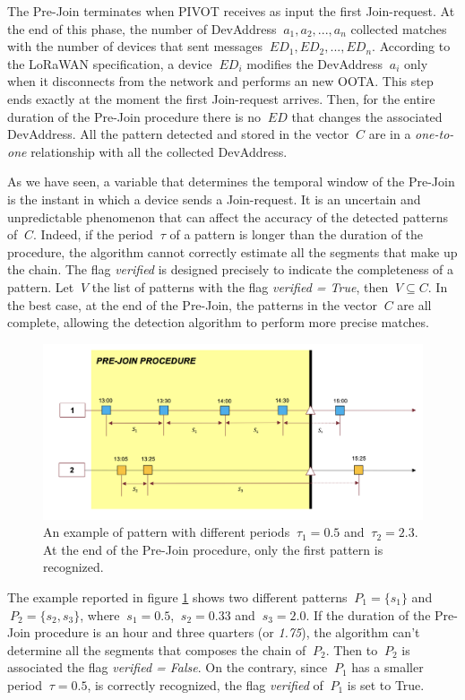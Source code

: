 The Pre-Join terminates when PIVOT receives as input the first Join-request. At the end of this phase, the number of DevAddress \(\ a_{1}, a_{2}, ..., a_{n} \) collected matches with the number of devices that sent messages \(\ ED_{1}, ED_{2}, ..., ED_{n} \). According to the LoRaWAN specification, a device \(\ ED_{i} \) modifies the DevAddress \(\ a_{i} \) only when it disconnects from the network and performs an new OOTA. This step ends exactly at the moment the first Join-request arrives. Then, for the entire duration of the Pre-Join procedure there is no \(\ ED \) that changes the associated DevAddress. All the pattern detected and stored in the vector \(\ C \) are in a \textit{one-to-one} relationship with all the collected DevAddress.

\vspace{5mm}

As we have seen, a variable that determines the temporal window of the Pre-Join is the instant in which a device sends a Join-request. It is an uncertain and unpredictable phenomenon that can affect the accuracy of the detected patterns of \(\ C \). Indeed, if the period \(\ \tau \) of a pattern is longer than the duration of the procedure, the algorithm cannot correctly estimate all the segments that make up the chain. The flag \textit{verified} is designed precisely to indicate the completeness of a pattern. Let \(\ V \) the list of patterns with the flag \textit{verified = True}, then \(\ V \subseteq C\). In the best case, at the end of the Pre-Join, the patterns in the vector \(\ C  \) are all complete, allowing the detection algorithm to perform more precise matches.

\vspace{3mm}
\begin{figure}
    \centering
    \includegraphics[width=0.7\linewidth]{images/pivot/missing_pattern.png}
    \caption{An example of pattern with different periods \(\ \tau_{1} = 0.5 \) and \(\ \tau_{2} = 2.3 \). At the end of the Pre-Join procedure, only the first pattern is recognized.}
\label{fig:missing}
\end{figure}
\vspace{3mm}

The example reported in figure \ref{fig:missing} shows two different patterns \(\ P_{1} = \{ s_{1} \} \) and \(\ P_{2} = \{ s_{2}, s_{3} \} \), where \(\ s_{1} = 0.5 \), \(\ s_{2} = 0.33 \) and \(\ s_{3} = 2.0 \). If the duration of the Pre-Join procedure is an hour and three quarters (or \textit{1.75}), the algorithm can't determine all the segments that composes the chain of \(\ P_{2} \). Then to \(\ P_{2} \) is associated the flag \textit{verified = False}. On the contrary, since \(\ P_{1} \) has a smaller period \(\ \tau = 0.5\),  is correctly recognized, the flag \textit{verified} of \(\ P_{1} \) is set to True.
\vspace{5mm}